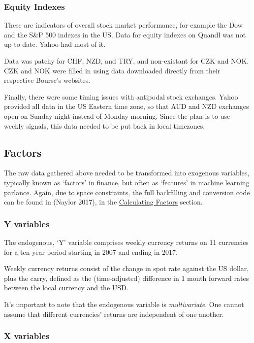 \documentclass[]{article}
\begin{document}
\subsubsection{Equity Indexes}\label{equity-indexes}

These are indicators of overall stock market performance, for example
the Dow and the S\&P 500 indexes in the US. Data for equity indexes on
Quandl was not up to date. Yahoo had most of it.

Data was patchy for CHF, NZD, and TRY, and non-existant for CZK and NOK.
CZK and NOK were filled in using data downloaded directly from their
respective Bourse's websites.

Finally, there were some timing issues with antipodal stock exchanges.
Yahoo provided all data in the US Eastern time zone, so that AUD and NZD
exchanges open on Sunday night instead of Monday morning. Since the plan
is to use weekly signals, this data needed to be put back in local
timezones.

\subsection{Factors}\label{factors}

The raw data gathered above needed to be transformed into exogenous
variables, typically known as `factors' in finance, but often as
`features' in machine learning parlance. Again, due to space
constraints, the full backfilling and conversion code can be found in
(Naylor 2017), in the
\href{https://charlesnaylor.github.io/gp_regression/doc/Calculating_Factors.html}{Calculating
Factors} section.

\subsubsection{Y variables}\label{y-variables}

The endogenous, `Y' variable comprises weekly currency returns on 11
currencies for a ten-year period starting in 2007 and ending in 2017.

Weekly currency returns consist of the change in spot rate against the
US dollar, plus the carry, defined as the (time-adjusted) difference in
1 month forward rates between the local currency and the USD.

It's important to note that the endogenous variable is
\emph{multivariate}. One cannot assume that different currencies'
returns are independent of one another.

\subsubsection{X variables}\label{x-variables}
\end{document}

